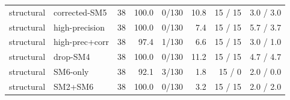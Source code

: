 \begin{table}[t]
\begin{tabular}{@{}llrrrrrr@{}}
structural & corrected-SM5 & 38 & 100.0 & 0/130 & 10.8 & 15 / 15 & 3.0 / 3.0 \\
structural & high-precision & 38 & 100.0 & 0/130 & 7.4 & 15 / 15 & 5.7 / 3.7 \\
structural & high-prec+corr & 38 & 97.4 & 1/130 & 6.6 & 15 / 15 & 3.0 / 1.0 \\
structural & drop-SM4 & 38 & 100.0 & 0/130 & 11.2 & 15 / 15 & 4.7 / 4.7 \\
structural & SM6-only & 38 & 92.1 & 3/130 & 1.8 & 15 / 0 & 2.0 / 0.0 \\
structural & SM2+SM6 & 38 & 100.0 & 0/130 & 3.2 & 15 / 15 & 2.0 / 2.0 \\
\bottomrule
\end{tabular}
\end{table}
